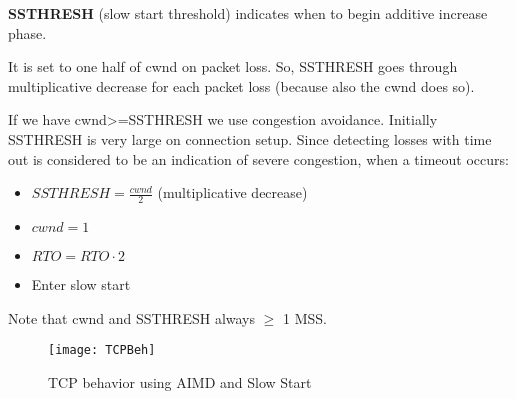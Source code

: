 \textbf{SSTHRESH} (slow start threshold) indicates when to begin additive
increase phase.

It is set to one half of cwnd on packet loss. So, SSTHRESH goes through
multiplicative decrease for each packet loss (because also the cwnd does so).

If we have cwnd>=SSTHRESH we use congestion avoidance.
Initially SSTHRESH is very large on connection setup.
Since detecting losses with time out is considered to be an indication 
of severe congestion, when a timeout occurs:	
\begin{itemize}
\item $SSTHRESH = \frac{cwnd}{2}$ (multiplicative decrease)
\item $cwnd=1$
\item $RTO=RTO \cdot 2$
\item Enter slow start
\end{itemize}

Note that cwnd and SSTHRESH always $\ge$ 1 MSS. 

\begin{figure}[t]
  \centering
  \texttt{[image: TCPBeh]}
  \caption{TCP behavior using AIMD and Slow Start}			
  \label{fig:tcp:TCPBeh}
\end{figure}

